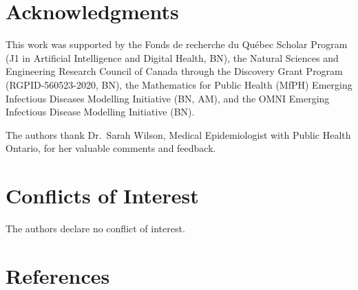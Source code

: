 \documentclass[
]{article}
\begin{document}
\hypertarget{acknowledgments}{%
\section{Acknowledgments}\label{acknowledgments}}

This work was supported by the Fonds de recherche du Québec Scholar
Program (J1 in Artificial Intelligence and Digital Health, BN), the
Natural Sciences and Engineering Research Council of Canada through the
Discovery Grant Program (RGPID-560523-2020, BN), the Mathematics for
Public Health (MfPH) Emerging Infectious Diseases Modelling Initiative
(BN, AM), and the OMNI Emerging Infectious Disease Modelling Initiative
(BN).

The authors thank Dr.~Sarah Wilson, Medical Epidemiologist with Public
Health Ontario, for her valuable comments and feedback.

\hypertarget{conflicts-of-interest}{%
\section{Conflicts of Interest}\label{conflicts-of-interest}}

The authors declare no conflict of interest.

\hypertarget{references}{%
\section{References}\label{references}}
\end{document}
